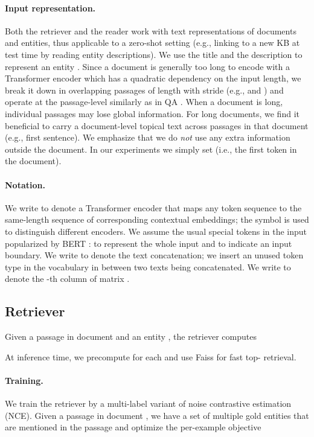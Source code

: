 \documentclass{article} \clearpage{}\usepackage{amsmath,amssymb,amsthm,bbm}
\theoremstyle{definition}
\begin{document}
\paragraph{Input representation.}
Both the retriever and the reader work with text representations of documents and entities, thus applicable to a zero-shot setting (e.g., linking to a new KB at test time by reading entity descriptions).
We use the title  and the description  to represent an entity .
Since a document  is generally too long to encode with a Transformer encoder which has a quadratic dependency on the input length, we break it down in  overlapping passages
 of length  with stride  (e.g.,  and ) and operate at the passage-level similarly as in QA \citep{alberti2019bert}.
When a document is long, individual passages may lose global information.
For long documents, we find it beneficial to carry a document-level topical text  across passages in that document (e.g., first sentence).
We emphasize that we do \emph{not} use any extra information outside the document.
In our experiments we simply set  (i.e., the first token in the document).

\paragraph{Notation.}
We write  to denote a Transformer encoder that maps any token sequence to the same-length sequence of corresponding contextual embeddings;
the symbol  is used to distinguish different encoders.
We assume the usual special tokens in the input popularized by BERT \citep{devlin2019bert}:  to represent the whole input and  to indicate an input boundary.
We write  to denote the text concatenation; we insert an unused token type in the vocabulary in between two texts being concatenated.
We write  to denote the -th column of matrix .

\subsection{Retriever}
\label{subsec:retriever}

Given a passage  in document  and an entity , the retriever computes

At inference time, we precompute  for each  and use Faiss \citep{johnson2019billion} for fast top- retrieval.

\paragraph{Training.}
We train the retriever by a multi-label variant of noise contrastive estimation (NCE).
Given a passage  in document , we have a set of multiple gold entities  that are mentioned in the passage and optimize the per-example objective
\end{document}
